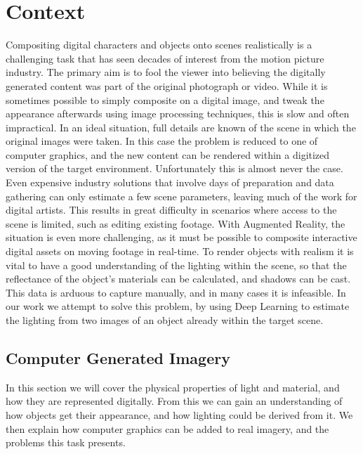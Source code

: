 \documentclass[ %
                    author={Gavin Parker},
                supervisor={Dr. Neill Campbell},
                    degree={MEng},
                     title={Deep Siamese Networks for Illumination Estimation from Stereo Images},
                  subtitle={},
                      type={Research},
                      year={2018} ]{dissertation}
\begin{document}
\mainmatter

\chapter{Context}
\label{chap:context}
Compositing digital characters and objects onto scenes realistically is a challenging task that has seen decades of interest from the motion picture industry. The primary aim is to fool the viewer into believing the digitally generated content was part of the original photograph or video. While it is sometimes possible to simply composite on a digital image, and tweak the appearance afterwards using image processing techniques, this is slow and often impractical. In an ideal situation, full details are known of the scene in which the original images were taken. In this case the problem is reduced to one of computer graphics, and the new content can be rendered within a digitized version of the target environment. Unfortunately this is almost never the case. Even expensive industry solutions that involve days of preparation and data gathering can only estimate a few scene parameters, leaving much of the work for digital artists. This results in great difficulty in scenarios where access to the scene is limited, such as editing existing footage. With Augmented Reality, the situation is even more challenging, as it must be possible to  composite interactive digital assets on moving footage in real-time.
\newline
To render objects with realism it is vital to have a good understanding of the lighting within the scene, so that the reflectance of the object's materials can be calculated, and shadows can be cast. This data is arduous to capture manually, and in many cases it is infeasible. In our work we attempt to solve this problem, by using Deep Learning to estimate the lighting from two images of an object already within the target scene.

\section{Computer Generated Imagery}
In this section we will cover the physical properties of light and material, and how they are represented digitally. From this we can gain an understanding of how objects get their appearance, and how lighting could be derived from it. We then explain how computer graphics can be added to real imagery, and the problems this task presents.
\end{document}
